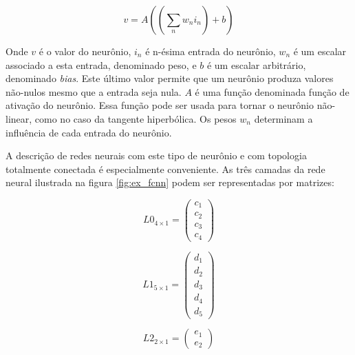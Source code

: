 \begin{equation} \label{eq:non-conv-layer}
	v=A \left( \left( \sum_n w_n i_n \right) + b \right)
\end{equation}

Onde $v$ é o valor do neurônio, $i_n$ é n-ésima entrada do neurônio,
$w_n$ é um escalar associado a esta entrada, denominado peso, e $b$ é um
escalar arbitrário, denominado \emph{bias}. Este último valor permite que um
neurônio produza valores não-nulos mesmo que a entrada seja nula. $A$ é uma
função denominada função de ativação do neurônio. Essa função pode ser usada
para tornar o neurônio não-linear, como no caso da tangente hiperbólica. Os
pesos $w_n$ determinam a influência de cada entrada do neurônio.

A descrição de redes neurais com este tipo de neurônio e com topologia
totalmente conectada é especialmente conveniente. As três camadas
da rede neural ilustrada na figura \ref{fig:ex_fcnn} podem ser representadas
por matrizes:

\noindent\begin{minipage}{.333\linewidth}
	\begin{equation} \label{eq:l0}
		L0_{4 \times 1} =
			\begin{pmatrix}
				c_1 \\
				c_2 \\
				c_3 \\
				c_4
			\end{pmatrix}
	\end{equation}
\end{minipage}
\begin{minipage}{.333\linewidth}
	\begin{equation} \label{eq:l1}
		L1_{5 \times 1} =
			\begin{pmatrix}
				d_1 \\
				d_2 \\
				d_3 \\
				d_4 \\
				d_5
			\end{pmatrix}
	\end{equation}
\end{minipage}
\begin{minipage}{.333\linewidth}
	\begin{equation} \label{eq:l2}
		L2_{2 \times 1} =
			\begin{pmatrix}
				e_1 \\
				e_2
			\end{pmatrix}
	\end{equation}
\end{minipage}

